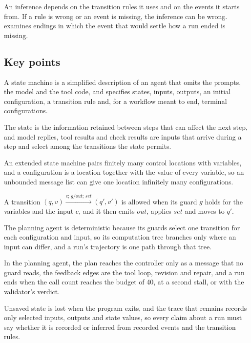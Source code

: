 An inference depends on the transition rules it uses and on the events it starts from. If a rule is
wrong or an event is missing, the inference can be wrong.  examines endings in which
the event that would settle how a run ended is missing.

\subsection*{Key points}
\bi
\item A state machine is a simplified description of an agent that omits the prompts, the model and
the tool code, and specifies states, inputs, outputs, an initial configuration, a transition rule
and, for a workflow meant to end, terminal configurations.
\item The state is the information retained between steps that can affect the next step, and model
replies, tool results and check results are inputs that arrive during a step and select among the
transitions the state permits.
\item An extended state machine pairs finitely many control locations with variables, and a
configuration is a location together with the value of every variable, so an unbounded message list
can give one location infinitely many configurations.
\item A transition $(q, v) \xrightarrow{e;\, g/\mathit{out};\, \mathit{set}} (q', v')$ is allowed
when its guard $g$ holds for the variables and the input $e$, and it then emits $\mathit{out}$,
applies $\mathit{set}$ and moves to $q'$.
\item The planning agent is deterministic because its guards select one transition for each
configuration and input, so its computation tree branches only where an input can differ, and a
run's trajectory is one path through that tree.
\item In the planning agent, the plan reaches the controller only as a message that no guard reads,
the feedback edges are the tool loop, revision and repair, and a run ends when the call count
reaches the budget of 40, at a second stall, or with the validator's verdict.
\item Unsaved state is lost when the program exits, and the trace that remains records only selected
inputs, outputs and state values, so every claim about a run must say whether it is recorded or
inferred from recorded events and the transition rules.
\ei
